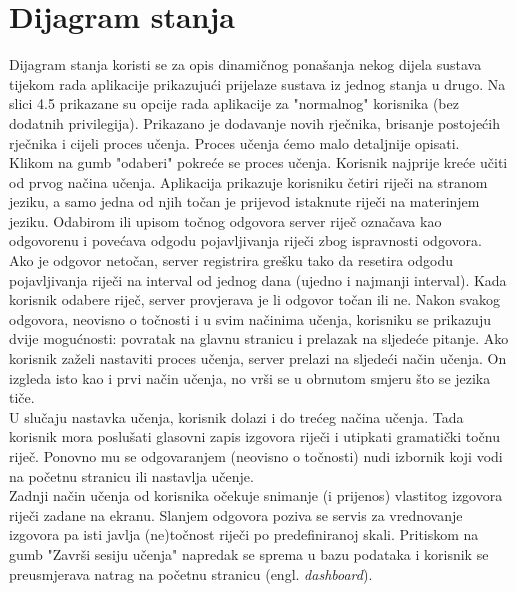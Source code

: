 		\section{Dijagram stanja}
        Dijagram stanja koristi se za opis dinamičnog ponašanja nekog dijela sustava tijekom rada aplikacije prikazujući prijelaze sustava iz jednog stanja u drugo.
        Na slici 4.5 prikazane su opcije rada aplikacije za "normalnog" korisnika (bez dodatnih privilegija). Prikazano je dodavanje novih rječnika, brisanje postojećih rječnika i cijeli proces učenja.
        Proces učenja ćemo malo detaljnije opisati.\newline
        \indent \\
        Klikom na gumb "odaberi" pokreće se proces učenja. Korisnik najprije kreće učiti od prvog načina učenja. Aplikacija prikazuje korisniku četiri riječi na stranom jeziku, a samo jedna od njih točan je prijevod istaknute riječi na materinjem jeziku.
        Odabirom ili upisom točnog odgovora server riječ označava kao odgovorenu i povećava odgodu pojavljivanja riječi zbog ispravnosti odgovora. \newline
        \\
        Ako je odgovor netočan, server registrira grešku tako da resetira odgodu pojavljivanja riječi na interval od jednog dana (ujedno i najmanji interval). 
        Kada korisnik odabere riječ, server provjerava je li odgovor točan ili ne. Nakon svakog odgovora, neovisno o točnosti i u svim načinima učenja, korisniku se prikazuju dvije mogućnosti: povratak na glavnu stranicu i prelazak na sljedeće pitanje.
        Ako korisnik zaželi nastaviti proces učenja, server prelazi na sljedeći način učenja. On izgleda isto kao i prvi način učenja, no vrši se u obrnutom smjeru što se jezika tiče. \newline
\\
        U slučaju nastavka učenja, korisnik dolazi i do trećeg načina učenja. Tada korisnik mora poslušati glasovni zapis izgovora riječi i utipkati gramatički točnu riječ. Ponovno mu se odgovaranjem (neovisno o točnosti) nudi izbornik koji vodi na početnu stranicu ili nastavlja učenje.
\newline
\\
        Zadnji način učenja od korisnika očekuje snimanje (i prijenos) vlastitog izgovora riječi zadane na ekranu. Slanjem odgovora poziva se servis za vrednovanje izgovora pa isti javlja (ne)točnost riječi po predefiniranoj skali.
        Pritiskom na gumb "Završi sesiju učenja" napredak se sprema u bazu podataka i korisnik se preusmjerava natrag na početnu stranicu (engl. \textit{dashboard}).
        
